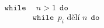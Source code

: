 \documentclass[preview]{standalone}
\begin{document}
\begin{align*}
\mathtt{while} & \:\: n > 1 \:\:  \mathtt{do}  \\& \mathtt{while}  \:\: p_i \text{ dělí } n \:\:  \mathtt{do}
\end{align*}
\end{document}
